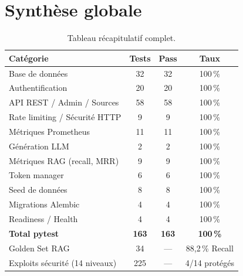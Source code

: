 \documentclass[12pt,a4paper,oneside]{report}
\newcommand{\chaptercolor}{mainblue}
\newcommand{\setchaptercolor}[1]{\renewcommand{\chaptercolor}{#1}}
\newcommand{\rowpass}{\rowcolor{passgreen}}
\begin{document}
\setchaptercolor{teal}
\chapter{Synth\`{e}se globale}

\begin{figure}[htbp]\centering
{}
\end{figure}

\begin{table}[htbp]\centering
\begin{tabular}{@{}lccc@{}}
\toprule
\textbf{Cat\'{e}gorie} & \textbf{Tests} & \textbf{Pass} & \textbf{Taux} \\
\midrule
\rowpass Base de donn\'{e}es & 32 & 32 & 100\,\% \\
\rowpass Authentification & 20 & 20 & 100\,\% \\
\rowpass API REST / Admin / Sources & 58 & 58 & 100\,\% \\
\rowpass Rate limiting / S\'{e}curit\'{e} HTTP & 9 & 9 & 100\,\% \\
\rowpass M\'{e}triques Prometheus & 11 & 11 & 100\,\% \\
\rowpass G\'{e}n\'{e}ration LLM & 2 & 2 & 100\,\% \\
\rowpass M\'{e}triques RAG (recall, MRR) & 9 & 9 & 100\,\% \\
\rowpass Token manager & 6 & 6 & 100\,\% \\
\rowpass Seed de donn\'{e}es & 8 & 8 & 100\,\% \\
\rowpass Migrations Alembic & 4 & 4 & 100\,\% \\
\rowpass Readiness / Health & 4 & 4 & 100\,\% \\
\midrule
\textbf{Total pytest} & \textbf{163} & \textbf{163} & \textbf{100\,\%} \\
\midrule
\rowpass Golden Set RAG & 34 & --- & 88,2\,\% Recall \\
\rowpass Exploits s\'{e}curit\'{e} (14 niveaux) & 225 & --- & 4/14 prot\'{e}g\'{e}s \\
\bottomrule
\end{tabular}
\caption{Tableau r\'{e}capitulatif complet.}
\label{tab:final}
\end{table}
\end{document}
